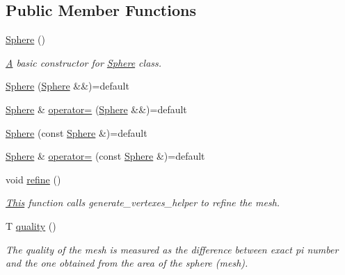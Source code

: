 \subsection*{Public Member Functions}
\begin{DoxyCompactItemize}
\item 
\mbox{\hyperlink{classSphere_acacfd6de079ea50acdaf57b823166651}{Sphere}} ()
\begin{DoxyCompactList}\small\item\em \mbox{\hyperlink{classA}{A}} basic constructor for \mbox{\hyperlink{classSphere}{Sphere}} class. \end{DoxyCompactList}\item 
\mbox{\hyperlink{classSphere_af0d667b078ae88955113205112d9aaa6}{Sphere}} (\mbox{\hyperlink{classSphere}{Sphere}} \&\&)=default
\item 
\mbox{\hyperlink{classSphere}{Sphere}} \& \mbox{\hyperlink{classSphere_aa117f966cea7b16532cbd80c2191a84a}{operator=}} (\mbox{\hyperlink{classSphere}{Sphere}} \&\&)=default
\item 
\mbox{\hyperlink{classSphere_ae28ad7649c59d653b9e14a3042d186a1}{Sphere}} (const \mbox{\hyperlink{classSphere}{Sphere}} \&)=default
\item 
\mbox{\hyperlink{classSphere}{Sphere}} \& \mbox{\hyperlink{classSphere_ae989d05c3ea71f5a758e90e2f2e3aecf}{operator=}} (const \mbox{\hyperlink{classSphere}{Sphere}} \&)=default
\item 
void \mbox{\hyperlink{classSphere_a3f5ee2b07e48a360696fe983690d1d1f}{refine}} ()
\begin{DoxyCompactList}\small\item\em \mbox{\hyperlink{classThis}{This}} function calls generate\+\_\+vertexes\+\_\+helper to refine the mesh. \end{DoxyCompactList}\item 
T \mbox{\hyperlink{classSphere_a9ebc65dabaf8d87fbe599f4b64816f73}{quality}} ()
\begin{DoxyCompactList}\small\item\em The quality of the mesh is measured as the difference between exact pi number and the one obtained from the area of the sphere (mesh). \end{DoxyCompactList}\end{DoxyCompactItemize}
